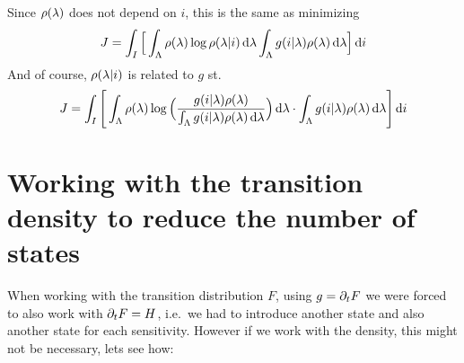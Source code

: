 \documentclass{article}
\begin{document}
Since $\rho({\lambda})$ does not depend on $i$, this is the same as minimizing
$$
J = \int_I \Big[\int_\Lambda \rho({\lambda}) \log \rho({\lambda}|i) \, \mathrm{d} {\lambda} \int_\Lambda
g(i|{\lambda}) \rho({\lambda})  \, \mathrm{d} {\lambda} \Big]\, \mathrm{d} i $$
And of course, $\rho({\lambda}|i)$ is related to $g$ st.
$$
J = \int_I \Bigg[
\int_\Lambda \rho({\lambda}) \log \Big(\frac{g(i|{\lambda})\rho({\lambda})}{\int_\Lambda g(i|{\lambda}) \rho({\lambda})  \, \mathrm{d} {\lambda}} \Big) \, \mathrm{d} {\lambda}
\cdot \int_\Lambda g(i|{\lambda}) \rho({\lambda})  \, \mathrm{d} {\lambda} \Bigg]
\, \mathrm{d} i $$

% 

\clearpage

\section{Working with the transition density to reduce the number of states}
When working with the transition distribution $F$, using $g = {\partial}_t F$ we were
forced to also work with ${\partial}_t F = H$, i.e.\ we had to introduce another state and also another state
for each sensitivity. However if we work with the density, this might not be
necessary, lets see how:
\end{document}

